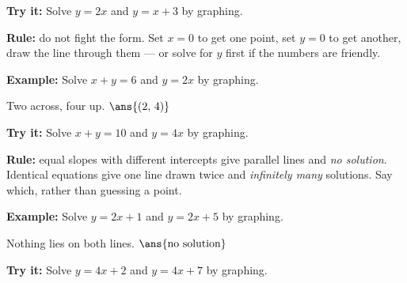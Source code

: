 \documentclass[12pt]{article}
\begin{document}
\begin{tryitbox}
\textbf{Try it:} \quad Solve $y = 2x$ and $y = x + 3$ by graphing.\\[2pt]
\end{tryitbox}


\begin{formulabox}
\textbf{Rule:} do not fight the form. Set $x = 0$ to get one point, set
$y = 0$ to get another, draw the line through them --- or solve for $y$ first
if the numbers are friendly.
\end{formulabox}

\begin{examplebox}
\textbf{Example:} \quad Solve $x + y = 6$ and $y = 2x$ by graphing.

Two across, four up. \quad $\ans{(2,\, 4)}$
\end{examplebox}

\begin{tryitbox}
\textbf{Try it:} \quad Solve $x + y = 10$ and $y = 4x$ by graphing.\\[2pt]
\end{tryitbox}


\begin{formulabox}
\textbf{Rule:} equal slopes with different intercepts give parallel lines and
\emph{no solution}. Identical equations give one line drawn twice and
\emph{infinitely many} solutions. Say which, rather than guessing a point.
\end{formulabox}

\begin{examplebox}
\textbf{Example:} \quad Solve $y = 2x + 1$ and $y = 2x + 5$ by graphing.

Nothing lies on both lines. \quad $\ans{\text{no solution}}$
\end{examplebox}

\begin{tryitbox}
\textbf{Try it:} \quad Solve $y = 4x + 2$ and $y = 4x + 7$ by graphing.\\[2pt]
\end{tryitbox}
\end{document}
